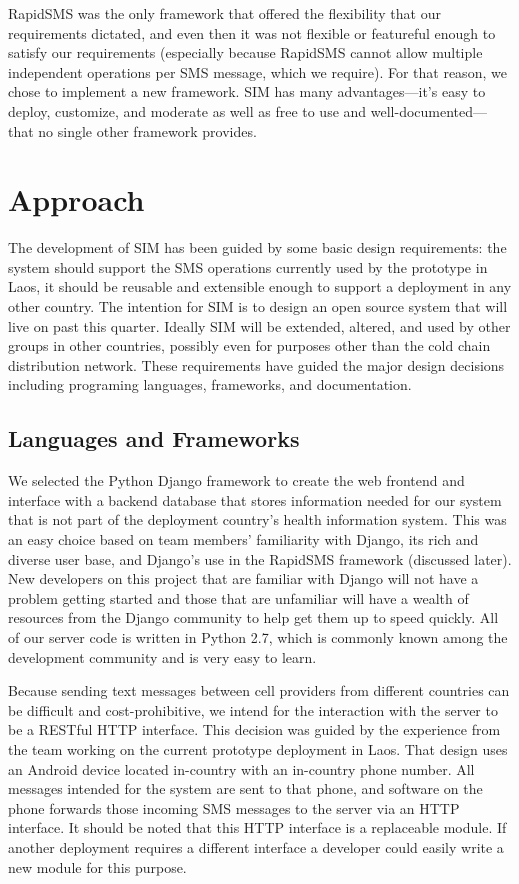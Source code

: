 \documentclass{acm_proc_article-sp}
\begin{document}
RapidSMS was the only framework that offered the flexibility that our requirements dictated, and even then it was not flexible or featureful enough to satisfy our requirements (especially because RapidSMS cannot allow multiple independent operations per SMS message, which we require). For that reason, we chose to implement a new framework. SIM has many advantages---it's easy to deploy, customize, and moderate as well as free to use and well-documented---that no single other framework provides.

\section{Approach}

The development of SIM has been guided by some basic design requirements: the system should support the SMS operations currently used by the prototype in Laos, it should be reusable and extensible enough to support a deployment in any other country. The intention for SIM is to design an open source system that will live on past this quarter. Ideally SIM will be extended, altered, and used by other groups in other countries, possibly even for purposes other than the cold chain distribution network. These requirements have guided the major design decisions including programing languages, frameworks, and documentation.

\subsection{Languages and Frameworks}

We selected the Python Django framework to create the web frontend and interface with a backend database that stores information needed for our system that is not part of the deployment country's health information system. This was an easy choice based on team members' familiarity with Django, its rich and diverse user base, and Django's use in the  RapidSMS framework (discussed later). New developers on this project that are familiar with Django will not have a problem getting started and those that are unfamiliar will have a wealth of resources from the Django community to help get them up to speed quickly. All of our server code is written in Python 2.7, which is commonly known among the development community and is very easy to learn. 
 
Because sending text messages between cell providers from different countries can be difficult and cost-prohibitive, we intend for the interaction with the server to be a RESTful HTTP interface. This decision was guided by the experience from the team working on the current prototype deployment in Laos. That design uses an Android device located in-country with an in-country phone number. All messages intended for the system are sent to that phone, and software on the phone forwards those incoming SMS messages to the server via an HTTP interface. It should be noted that this HTTP interface is a replaceable module. If another deployment requires a different interface a developer could easily write a new module for this purpose. 
\end{document}
